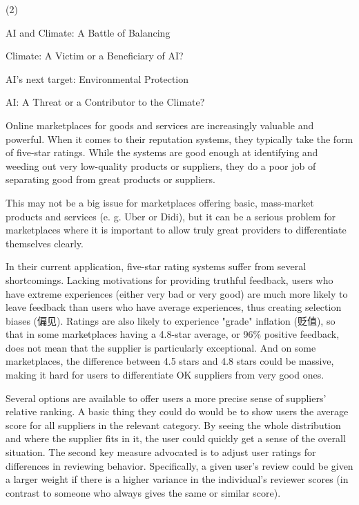\documentclass{英语试卷}
\begin{document}
\begin{choices}(2)
  \item AI and Climate: A Battle of Balancing
  \item Climate: A Victim or a Beneficiary of AI?
  \item AI's next target: Environmental Protection
  \item AI: A Threat or a Contributor to the Climate?
\end{choices}
\par Online marketplaces for goods and services are increasingly valuable and powerful. When it comes to their reputation systems, they typically take the form of five-star ratings. While the systems are good enough at identifying and weeding out very low-quality products or suppliers, they do a poor job of separating good from great products or suppliers.\par
\par This may not be a big issue for marketplaces offering basic, mass-market products and services (e. g. Uber or Didi), but it can be a serious problem for marketplaces where it is important to allow truly great providers to differentiate themselves clearly.\par
\par In their current application, five-star rating systems suffer from several shortcomings. Lacking motivations for providing truthful feedback, users who have extreme experiences (either very bad or very good) are much more likely to leave feedback than users who have average experiences, thus creating selection biases (偏见). Ratings are also likely to experience "grade" inflation (贬值), so that in some marketplaces having a 4.8-star average, or 96\% positive feedback, does not mean that the supplier is particularly exceptional. And on some marketplaces, the difference between 4.5 stars and 4.8 stars could be massive, making it hard for users to differentiate OK suppliers from very good ones.\par
\par Several options are available to offer users a more precise sense of suppliers' relative ranking. A basic thing they could do would be to show users the average score for all suppliers in the relevant category. By seeing the whole distribution and where the supplier fits in it, the user could quickly get a sense of the overall situation. The second key measure advocated is to adjust user ratings for differences in reviewing behavior. Specifically, a given user's review could be given a larger weight if there is a higher variance in the individual's reviewer scores (in contrast to someone who always gives the same or similar score).\par
\end{document}
